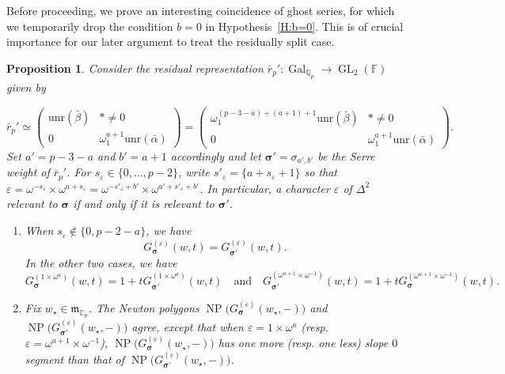\documentclass[12pt]{amsart}
\newtheorem{proposition}[subsection]{Proposition}
\theoremstyle{definition}
\numberwithin{equation}{subsection}
\def\gothm{\mathfrak{m}}
\def\CC{\mathbb{C}}
\def\FF{\mathbb{F}}
\def\QQ{\mathbb{Q}}
\DeclareMathOperator{\Gal}{Gal}
\DeclareMathOperator{\GL}{GL}
\DeclareMathOperator{\NP}{NP}
\newcommand{\bbsigma}{\boldsymbol{\sigma}}
\newcommand{\unr}{\mathrm{unr}}
\newcommand{\MATRIX}[4]{{\begin{pmatrix}#1&#2\\#3& #4\end{pmatrix}}}
\begin{document}
Before proceeding, we prove an interesting coincidence of ghost series, for which we temporarily drop the condition $b=0$ in Hypothesis~\ref{H:b=0}.   This is of crucial importance for our later argument to treat the residually split case.

\begin{proposition}
\label{P:ghost series identity}
Consider the residual representation $\bar r_p': \Gal_{\QQ_p} \to \GL_2(\FF)$ given by

$$
\bar r_p' \simeq \MATRIX{\unr(\bar\beta)}{*\neq 0}{0}{\omega_1^{a+1}\unr(\bar \alpha)} = \begin{pmatrix}
\omega_1^{(p-3-a) + (a+1)+1}\unr(\bar\beta) & *\neq 0\\ 0 & \omega_1^{a+1}\unr(\bar\alpha)
\end{pmatrix}.
$$
Set $a' = p-3-a$ and $b' = a+1$ accordingly and let $\bbsigma'=\sigma_{a',b'}$ be the Serre weight of $\bar r_p'$. For $s_\varepsilon \in \{0, \dots, p-2\}$, write $s'_\varepsilon = \{a+s_\varepsilon+1\}$ so that $\varepsilon = \omega^{-s_\varepsilon} \times \omega^{a+s_\varepsilon} = \omega^{-s'_{\varepsilon}+b'} \times \omega^{a'+s'_\varepsilon+b'}$. In particular, a character $\varepsilon$ of $\Delta^2$ relevant to $\bbsigma$ if and only if it is relevant to $\bbsigma'$.
\begin{enumerate}
\item When $s_\varepsilon \notin\{0, p-2-a\}$, we have
$$
G_{\bbsigma}^{(\varepsilon)}(w,t) = G_{\bbsigma'}^{(\varepsilon)}(w,t).
$$
In the other two cases, we have
\begin{equation}
\label{E:G equality exceptional}
G_{\bbsigma}^{(1\times\omega^a)}(w,t) = 1+ tG_{\bbsigma'}^{(1\times\omega^a)}(w,t)\quad \textrm{and}\quad G_{\bbsigma'}^{(\omega^{a+1}\times \omega^{-1})}(w,t) = 1+ tG_{\bbsigma}^{(\omega^{a+1}\times \omega^{-1})}(w,t).
\end{equation}
\item Fix $w_\star \in \gothm_{\CC_p}$. The Newton polygons $\NP\big(G_{\bbsigma}^{(\varepsilon)}(w_\star,-)\big)$ and $\NP\big(G_{\bbsigma'}^{(\varepsilon)}(w_\star,-)\big)$ agree, except that when $\varepsilon = 1 \times \omega^a$ (resp.  $\varepsilon = \omega^{a+1}\times \omega^{-1}$), $\NP\big(G_{\bbsigma}^{(\varepsilon)}(w_\star,-)\big)$ has one more (resp. one less) slope $0$ segment than that of  $\NP\big(G_{\bbsigma'}^{(\varepsilon)}(w_\star,-)\big)$.

\end{enumerate}

\end{proposition}
\end{document}
